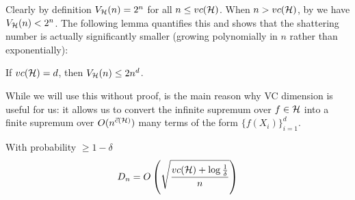 Clearly by definition $V_{\mathcal{H}}(n) = 2^n$ for all $n \leq vc(\mathcal{H})$.
When $n > vc(\mathcal{H})$, by  we have $V_{\mathcal{H}}(n) < 2^n$.
The following lemma quantifies this and shows that the shattering number
is actually significantly smaller (growing polynomially in $n$ rather than exponentially):
\begin{lemma}\label{lem:sauer-shelah}
    If $vc(\mathcal{H}) = d$, then $V_{\mathcal{H}}(n) \leq 2 n^d$.
\end{lemma}
While we will use this without proof,  is the main reason why VC dimension
is useful for us: it allows us to convert the infinite supremum over $f \in \mathcal{H}$ into a finite supremum over
$O(n^{\vec{c}(\mathcal{H})})$ many terms of the form $\{f(X_i)\}_{i=1}^d$.

\begin{theorem}[VC inequality]\label{thm:vc-inequality}
    With probability $\geq 1 - \delta$
    \begin{align}
        D_n = O\left(\sqrt{\frac{vc(\mathcal{H}) + \log \frac{1}{\delta}}{n}}\right)    
    \end{align}
\end{theorem}

